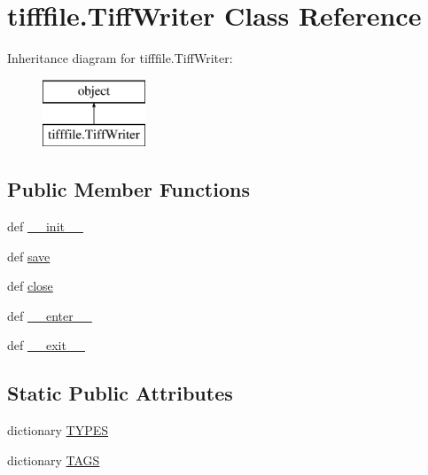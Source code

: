 \hypertarget{classtifffile_1_1_tiff_writer}{\section{tifffile.\-Tiff\-Writer Class Reference}
\label{classtifffile_1_1_tiff_writer}
}
Inheritance diagram for tifffile.\-Tiff\-Writer\-:\begin{figure}[H]
\begin{center}
\leavevmode
\includegraphics[height=2.000000cm]{classtifffile_1_1_tiff_writer}
\end{center}
\end{figure}
\subsection*{Public Member Functions}
\begin{DoxyCompactItemize}
\item 
def \hyperlink{classtifffile_1_1_tiff_writer_af9fb37461e229375ed0b7c7aa56fcf2a}{\-\_\-\-\_\-init\-\_\-\-\_\-}
\item 
def \hyperlink{classtifffile_1_1_tiff_writer_a7879708dbcc972bda2148374bddbec0d}{save}
\item 
def \hyperlink{classtifffile_1_1_tiff_writer_a579dd794187e65874987990058ba70aa}{close}
\item 
def \hyperlink{classtifffile_1_1_tiff_writer_aeb1a99b0e609acf41b4a96029397724d}{\-\_\-\-\_\-enter\-\_\-\-\_\-}
\item 
def \hyperlink{classtifffile_1_1_tiff_writer_a9a746e2cea3adaab40913a74fb56ca60}{\-\_\-\-\_\-exit\-\_\-\-\_\-}
\end{DoxyCompactItemize}
\subsection*{Static Public Attributes}
\begin{DoxyCompactItemize}
\item 
dictionary \hyperlink{classtifffile_1_1_tiff_writer_aae9c1bc9345c95fe80d2d31188e6e23d}{T\-Y\-P\-E\-S}
\item 
dictionary \hyperlink{classtifffile_1_1_tiff_writer_a59306b1d4123917f8ef19b622932be69}{T\-A\-G\-S}
\end{DoxyCompactItemize}


